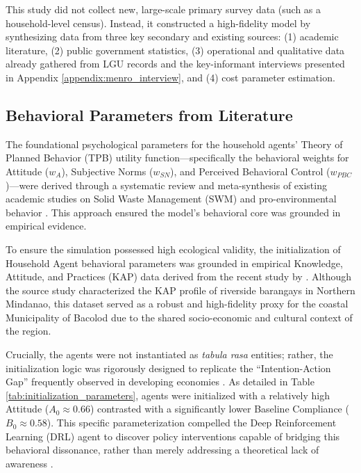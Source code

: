 This study did not collect new, large-scale primary survey data (such as a household-level census). Instead, it constructed a high-fidelity model by synthesizing data from three key secondary and existing sources: (1) academic literature, (2) public government statistics, (3) operational and qualitative data already gathered from LGU records and the key-informant interviews presented in Appendix \ref{appendix:menro_interview}, and (4) cost parameter estimation.

\subsection{Behavioral Parameters from Literature}

The foundational psychological parameters for the household agents' Theory of Planned Behavior (TPB) utility function—specifically the behavioral weights for Attitude ($w_A$), Subjective Norms ($w_{SN}$), and Perceived Behavioral Control ($w_{PBC}$)—were derived through a systematic review and meta-synthesis of existing academic studies on Solid Waste Management (SWM) and pro-environmental behavior \citep{Taraghi2025, Moeini2023}. This approach ensured the model's behavioral core was grounded in empirical evidence.

To ensure the simulation possessed high ecological validity, the initialization of Household Agent behavioral parameters was grounded in empirical Knowledge, Attitude, and Practices (KAP) data derived from the recent study by \citet{Paigalan2025}. Although the source study characterized the KAP profile of riverside barangays in Northern Mindanao, this dataset served as a robust and high-fidelity proxy for the coastal Municipality of Bacolod due to the shared socio-economic and cultural context of the region.

Crucially, the agents were not instantiated as \textit{tabula rasa} entities; rather, the initialization logic was rigorously designed to replicate the ``Intention-Action Gap'' frequently observed in developing economies \citep{Yazawa2025, Catiil2025}. As detailed in Table \ref{tab:initialization_parameters}, agents were initialized with a relatively high Attitude ($A_0 \approx 0.66$) contrasted with a significantly lower Baseline Compliance ($B_0 \approx 0.58$). This specific parameterization compelled the Deep Reinforcement Learning (DRL) agent to discover policy interventions capable of bridging this behavioral dissonance, rather than merely addressing a theoretical lack of awareness \citep{Paigalan2025}.

